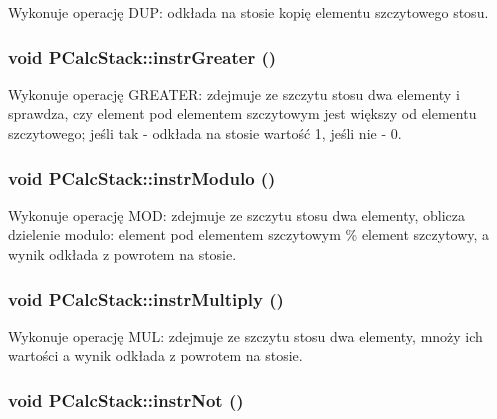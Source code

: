 Wykonuje operację DUP: odkłada na stosie kopię elementu szczytowego stosu. \hypertarget{classPCalcStack_b656cedeb6038c6e3af6e01df21d8c1b}{
\subsubsection[{instrGreater}]{\setlength{\rightskip}{0pt plus 5cm}void PCalcStack::instrGreater ()}}
\label{classPCalcStack_b656cedeb6038c6e3af6e01df21d8c1b}


Wykonuje operację GREATER: zdejmuje ze szczytu stosu dwa elementy i sprawdza, czy element pod elementem szczytowym jest większy od elementu szczytowego; jeśli tak - odkłada na stosie wartość 1, jeśli nie - 0. \hypertarget{classPCalcStack_bda10d125ac0b2dee9398ce185435fdb}{
\subsubsection[{instrModulo}]{\setlength{\rightskip}{0pt plus 5cm}void PCalcStack::instrModulo ()}}
\label{classPCalcStack_bda10d125ac0b2dee9398ce185435fdb}


Wykonuje operację MOD: zdejmuje ze szczytu stosu dwa elementy, oblicza dzielenie modulo: element pod elementem szczytowym \% element szczytowy, a wynik odkłada z powrotem na stosie. \hypertarget{classPCalcStack_0d2b0b03f9a14c875364d4a5dabb6d7a}{
\subsubsection[{instrMultiply}]{\setlength{\rightskip}{0pt plus 5cm}void PCalcStack::instrMultiply ()}}
\label{classPCalcStack_0d2b0b03f9a14c875364d4a5dabb6d7a}


Wykonuje operację MUL: zdejmuje ze szczytu stosu dwa elementy, mnoży ich wartości a wynik odkłada z powrotem na stosie. \hypertarget{classPCalcStack_5fe0eb9337f3e18416e02c082c14dc66}{
\subsubsection[{instrNot}]{\setlength{\rightskip}{0pt plus 5cm}void PCalcStack::instrNot ()}}
\label{classPCalcStack_5fe0eb9337f3e18416e02c082c14dc66}


